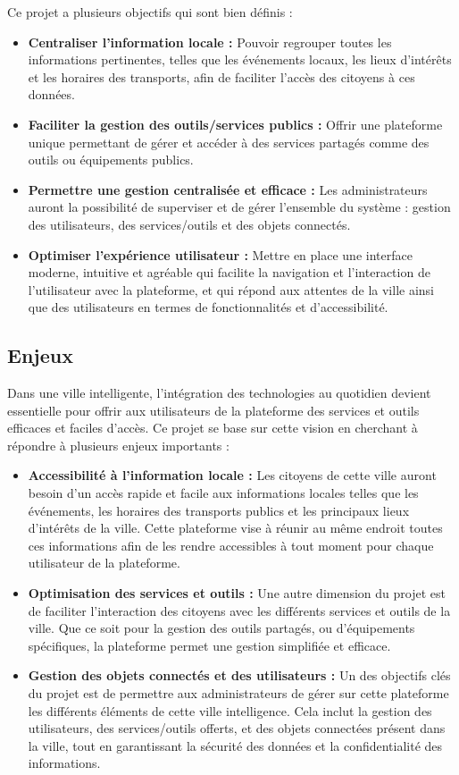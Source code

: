 \documentclass[a4paper,12pt]{report}
\begin{document}
	Ce projet a plusieurs objectifs qui sont bien définis :
	
	\begin{itemize}
		\item \textbf{Centraliser l'information locale :} Pouvoir regrouper toutes les informations pertinentes, telles que les événements locaux, les lieux d'intérêts et les horaires des transports, afin de faciliter l’accès des citoyens à ces données.
		\item \textbf{Faciliter la gestion des outils/services publics :} Offrir une plateforme unique permettant de gérer et accéder à des services partagés comme des outils ou équipements publics.
		\item \textbf{Permettre une gestion centralisée et efficace :} Les administrateurs auront la possibilité de superviser et de gérer l’ensemble du système : gestion des utilisateurs, des services/outils et des objets connectés.
		\item \textbf{Optimiser l'expérience utilisateur :} Mettre en place une interface moderne, intuitive et agréable qui facilite la navigation et l’interaction de l'utilisateur avec la plateforme, et qui répond aux attentes de la ville ainsi que des utilisateurs en termes de fonctionnalités et d’accessibilité.
	\end{itemize}
	
	\subsection{Enjeux}
	
	Dans une ville intelligente, l'intégration des technologies au quotidien devient essentielle pour offrir aux utilisateurs de la plateforme des services et outils efficaces et faciles d'accès. Ce projet se base sur cette vision en cherchant à répondre à plusieurs enjeux importants :
	
	\begin{itemize}
		\item \textbf{Accessibilité à l’information locale :} Les citoyens de cette ville auront besoin d’un accès rapide et facile aux informations locales telles que les événements, les horaires des transports publics et les principaux lieux d'intérêts de la ville. Cette plateforme vise à réunir au même endroit toutes ces informations afin de les rendre accessibles à tout moment pour chaque utilisateur de la plateforme.
		\item \textbf{Optimisation des services et outils :} Une autre dimension du projet est de faciliter l’interaction des citoyens avec les différents services et outils de la ville. Que ce soit pour la gestion des outils partagés, ou d'équipements spécifiques, la plateforme permet une gestion simplifiée et efficace.
		\item \textbf{Gestion des objets connectés et des utilisateurs :} Un des objectifs clés du projet est de permettre aux administrateurs de gérer sur cette plateforme les différents éléments de cette ville intelligence. Cela inclut la gestion des utilisateurs, des services/outils offerts, et des objets connectées présent dans la ville, tout en garantissant la sécurité des données et la confidentialité des informations.
	\end{itemize}
	
\end{document}
